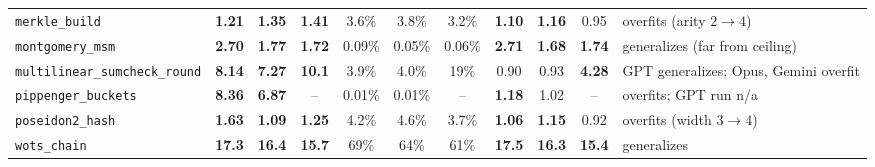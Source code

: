 \begin{table}[t]
\begin{tabular}{l ccc ccc ccc l}
\texttt{merkle\_build} & \textbf{1.21} & \textbf{1.35} & \textbf{1.41} & 3.6\% & 3.8\% & 3.2\% & \textbf{1.10} & \textbf{1.16} & 0.95 & overfits (arity $2\!\to\!4$) \\
\texttt{montgomery\_msm} & \textbf{2.70} & \textbf{1.77} & \textbf{1.72} & 0.09\% & 0.05\% & 0.06\% & \textbf{2.71} & \textbf{1.68} & \textbf{1.74} & generalizes (far from ceiling) \\
\texttt{multilinear\_sumcheck\_round} & \textbf{8.14} & \textbf{7.27} & \textbf{10.1} & 3.9\% & 4.0\% & 19\% & 0.90 & 0.93 & \textbf{4.28} & GPT generalizes; Opus, Gemini overfit \\
\texttt{pippenger\_buckets} & \textbf{8.36} & \textbf{6.87} & -- & 0.01\% & 0.01\% & -- & \textbf{1.18} & 1.02 & -- & overfits; GPT run n/a \\
\texttt{poseidon2\_hash} & \textbf{1.63} & \textbf{1.09} & \textbf{1.25} & 4.2\% & 4.6\% & 3.7\% & \textbf{1.06} & \textbf{1.15} & 0.92 & overfits (width $3\!\to\!4$) \\
\texttt{wots\_chain} & \textbf{17.3} & \textbf{16.4} & \textbf{15.7} & 69\% & 64\% & 61\% & \textbf{17.5} & \textbf{16.3} & \textbf{15.4} & generalizes \\
\bottomrule
\end{tabular}
\end{table}
